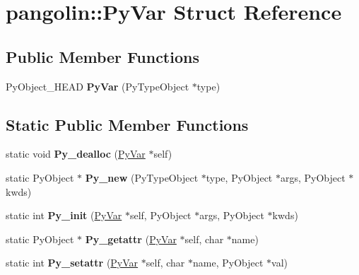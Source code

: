 \hypertarget{structpangolin_1_1_py_var}{}\section{pangolin\+:\+:Py\+Var Struct Reference}
\label{structpangolin_1_1_py_var}
\subsection*{Public Member Functions}
\begin{DoxyCompactItemize}
\item 
Py\+Object\+\_\+\+H\+E\+AD {\bfseries Py\+Var} (Py\+Type\+Object $\ast$type)\hypertarget{structpangolin_1_1_py_var_aa473b639c7e0f8eae7a5231433fb0a2c}{}\label{structpangolin_1_1_py_var_aa473b639c7e0f8eae7a5231433fb0a2c}

\end{DoxyCompactItemize}
\subsection*{Static Public Member Functions}
\begin{DoxyCompactItemize}
\item 
static void {\bfseries Py\+\_\+dealloc} (\hyperlink{structpangolin_1_1_py_var}{Py\+Var} $\ast$self)\hypertarget{structpangolin_1_1_py_var_a4eb34b521908b2fc6475cb995de295de}{}\label{structpangolin_1_1_py_var_a4eb34b521908b2fc6475cb995de295de}

\item 
static Py\+Object $\ast$ {\bfseries Py\+\_\+new} (Py\+Type\+Object $\ast$type, Py\+Object $\ast$args, Py\+Object $\ast$kwds)\hypertarget{structpangolin_1_1_py_var_aa6170501c16da5a331e6fb45fcb1d823}{}\label{structpangolin_1_1_py_var_aa6170501c16da5a331e6fb45fcb1d823}

\item 
static int {\bfseries Py\+\_\+init} (\hyperlink{structpangolin_1_1_py_var}{Py\+Var} $\ast$self, Py\+Object $\ast$args, Py\+Object $\ast$kwds)\hypertarget{structpangolin_1_1_py_var_a363ce6897c5fb8c3cfed688e12780a70}{}\label{structpangolin_1_1_py_var_a363ce6897c5fb8c3cfed688e12780a70}

\item 
static Py\+Object $\ast$ {\bfseries Py\+\_\+getattr} (\hyperlink{structpangolin_1_1_py_var}{Py\+Var} $\ast$self, char $\ast$name)\hypertarget{structpangolin_1_1_py_var_a5aac21ee4d27de2b7de87d5b8d37f0e9}{}\label{structpangolin_1_1_py_var_a5aac21ee4d27de2b7de87d5b8d37f0e9}

\item 
static int {\bfseries Py\+\_\+setattr} (\hyperlink{structpangolin_1_1_py_var}{Py\+Var} $\ast$self, char $\ast$name, Py\+Object $\ast$val)\hypertarget{structpangolin_1_1_py_var_a09ac9a993882c98728fafcdf094ee6f5}{}\label{structpangolin_1_1_py_var_a09ac9a993882c98728fafcdf094ee6f5}

\end{DoxyCompactItemize}

